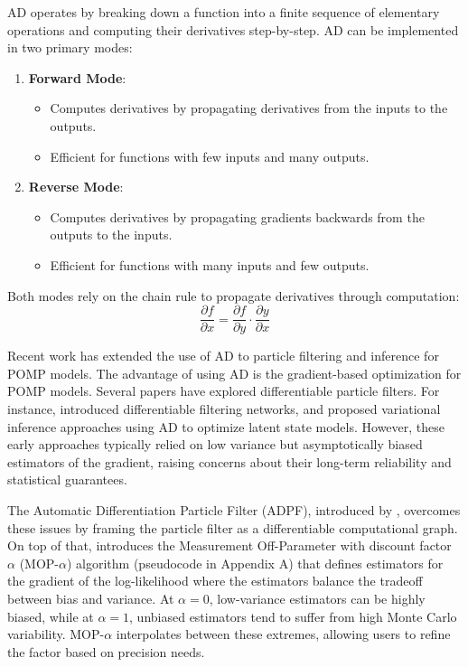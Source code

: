 \documentclass[11pt]{report}
\begin{document}
AD operates by breaking down a function into a finite sequence of elementary operations and computing their derivatives step-by-step. AD can be implemented in two primary modes:
\begin{enumerate}
    \item \textbf{Forward Mode}:
    \begin{itemize}
        \item Computes derivatives by propagating derivatives from the inputs to the outputs.
        \item Efficient for functions with few inputs and many outputs.
    \end{itemize}
    \item \textbf{Reverse Mode}:
    \begin{itemize}
        \item Computes derivatives by propagating gradients backwards from the outputs to the inputs.
        \item Efficient for functions with many inputs and few outputs.
    \end{itemize}
\end{enumerate}
Both modes rely on the chain rule to propagate derivatives through computation:
\[\frac{\partial f}{\partial x} = \frac{\partial f}{\partial y} \cdot \frac{\partial y}{\partial x}\]

Recent work has extended the use of AD to particle filtering and inference for POMP models. The advantage of using AD is the gradient-based optimization for POMP models. Several papers have explored differentiable particle filters. For instance, \citet{jonschkowski2018differentiable} introduced differentiable filtering networks, and \citet{naesseth2018variational} proposed variational inference approaches using AD to optimize latent state models. However, these early approaches typically relied on low variance but asymptotically biased estimators of the gradient, raising concerns about their long-term reliability and statistical guarantees.

The Automatic Differentiation Particle Filter (ADPF), introduced by \citet{tandifferentiable}, overcomes these issues by framing the particle filter as a differentiable computational graph. On top of that, \citet{tan2024accelerated} introduces the Measurement Off-Parameter with discount factor $\alpha$ (MOP-$\alpha$) algorithm (pseudocode in Appendix A) that defines estimators for the gradient of the log-likelihood where the estimators balance the tradeoff between bias and variance. At $\alpha = 0$, low-variance estimators can be highly biased, while at $\alpha = 1$, unbiased estimators tend to suffer from high Monte Carlo variability. MOP-$\alpha$ interpolates between these extremes, allowing users to refine the factor based on precision needs.
\end{document}
